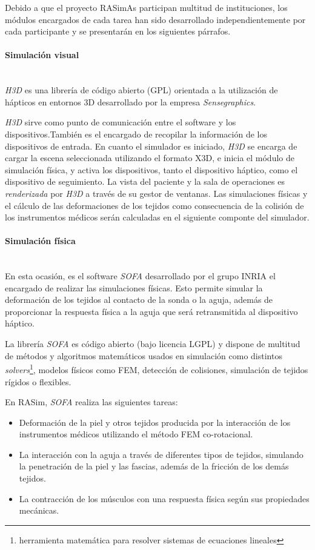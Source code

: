 Debido a que el proyecto \ac{RASimAs} participan multitud de instituciones, los módulos encargados de cada tarea han sido desarrollado independientemente por cada participante y se presentarán en los siguientes párrafos.

\paragraph{Simulación visual}\mbox{}\\

\emph{H3D}\cite{asdf} es una librería de código abierto (\ac{GPL})  orientada a la utilización de hápticos en entornos 3D desarrollado por la empresa \emph{Sensegraphics}. 

\emph{H3D} sirve como punto de comunicación entre el software y los dispositivos.También es el encargado de recopilar la información de los dispositivos de entrada.
En cuanto el simulador es iniciado, \emph{H3D} se encarga de cargar la escena seleccionada utilizando el formato \ac{X3D}, e inicia el módulo de simulación física, y activa los dispositivos, tanto el dispositivo háptico, como el dispositivo de seguimiento. La vista del paciente y la sala de operaciones es \emph{renderizada} por \emph{H3D} a través de su gestor de ventanas. Las simulaciones físicas y el cálculo de las deformaciones de los tejidos como consecuencia de la colisión de los instrumentos médicos serán calculadas en el siguiente componte del simulador.

\paragraph{Simulación física}\mbox{}\\

En esta ocasión, es el software \emph{SOFA} desarrollado por el grupo \ac{INRIA} el encargado de realizar las simulaciones físicas. Esto permite simular la deformación de los tejidos al contacto de la sonda o la aguja, además de proporcionar la respuesta física a la aguja que será retransmitida al dispositivo háptico.

La librería \emph{SOFA} es código abierto (bajo licencia \ac{LGPL}) y dispone de multitud de métodos y algoritmos matemáticos usados en simulación como distintos \emph{solvers}\footnote{herramienta matemática para resolver sistemas de ecuaciones lineales}, modelos físicos como \ac{FEM}, detección de colisiones, simulación de tejidos rígidos o flexibles.

En \ac{RASim}, \emph{SOFA} realiza las siguientes tareas:
\begin{itemize}
    \item Deformación de la piel y otros tejidos producida por la interacción de los instrumentos médicos utilizando el método \ac{FEM} co-rotacional.
    \item La interacción con la aguja a través de diferentes tipos de tejidos, simulando la penetración de la piel y las fascias, además de la fricción de los demás tejidos.
   \item La contracción de los músculos con una respuesta física según sus propiedades mecánicas.
    
\end{itemize}

